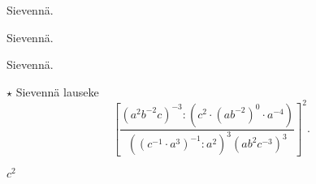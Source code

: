 \begin{tehtavasivu}
\begin{tehtava}
  		Sievennä.
        \begin{alakohdatrivi}
 		\end{alakohdatrivi}
        \begin{vastaus}
        \begin{alakohdatrivi}
        \end{alakohdatrivi}
        \end{vastaus}
\end{tehtava}

\begin{tehtava}
  		Sievennä.
        \begin{alakohdatrivi}
 		\end{alakohdatrivi}
        \begin{vastaus}
        \begin{alakohdatrivi}
        \end{alakohdatrivi}
        \end{vastaus}
\end{tehtava}

\begin{tehtava}
  		Sievennä.
        \begin{alakohdat}
 		\end{alakohdat}
        \begin{vastaus}
        \begin{alakohdatrivi}
        \end{alakohdatrivi}
        \end{vastaus}
\end{tehtava}
 
\begin{tehtava}
  		$\star$ Sievennä lauseke
$$\left[ \frac{(a^2b^{-2}c)^{-3}:\left(c^2\cdot (ab^{-2})^0 \cdot a^{-4}\right)}
{\left((c^{-1}\cdot a^3)^{-1}:a^2\right)^3(ab^2c^{-3})^3} \right]^2.$$
\begin{vastaus}
$c^2$
\end{vastaus}
\end{tehtava} 
 

\end{tehtavasivu}
